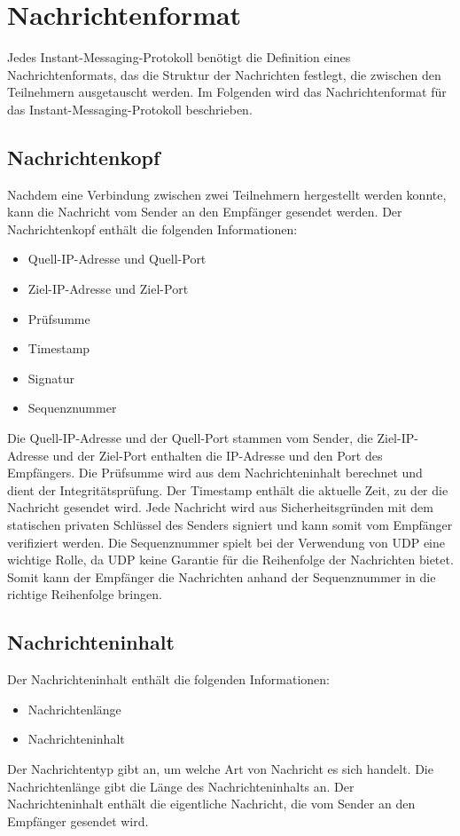 \section{Nachrichtenformat}
\label{sec:nachrichtenformat}

Jedes Instant-Messaging-Protokoll benötigt die Definition eines Nachrichtenformats, das die Struktur der Nachrichten festlegt, die zwischen den Teilnehmern ausgetauscht werden. Im Folgenden wird das Nachrichtenformat für das Instant-Messaging-Protokoll beschrieben.

\subsection{Nachrichtenkopf}

Nachdem eine Verbindung zwischen zwei Teilnehmern hergestellt werden konnte, kann die Nachricht vom Sender an den Empfänger gesendet werden. Der Nachrichtenkopf enthält die folgenden Informationen:

\begin{itemize}
    \item Quell-IP-Adresse und Quell-Port
    \item Ziel-IP-Adresse und Ziel-Port
    \item Prüfsumme
    \item Timestamp
    \item Signatur
    \item Sequenznummer
\end{itemize}

\noindent Die Quell-IP-Adresse und der Quell-Port stammen vom Sender, die Ziel-IP-Adresse und der Ziel-Port enthalten die IP-Adresse und den Port des Empfängers. Die Prüfsumme wird aus dem Nachrichteninhalt berechnet und dient der Integritätsprüfung. Der Timestamp enthält die aktuelle Zeit, zu der die Nachricht gesendet wird. Jede Nachricht wird aus Sicherheitsgründen mit dem statischen privaten Schlüssel des Senders signiert und kann somit vom Empfänger verifiziert werden. Die Sequenznummer spielt bei der Verwendung von UDP eine wichtige Rolle, da UDP keine Garantie für die Reihenfolge der Nachrichten bietet. Somit kann der Empfänger die Nachrichten anhand der Sequenznummer in die richtige Reihenfolge bringen.

\subsection{Nachrichteninhalt}

Der Nachrichteninhalt enthält die folgenden Informationen:

\begin{itemize}
    \item Nachrichtenlänge
    \item Nachrichteninhalt
\end{itemize}

\noindent Der Nachrichtentyp gibt an, um welche Art von Nachricht es sich handelt. Die Nachrichtenlänge gibt die Länge des Nachrichteninhalts an. Der Nachrichteninhalt enthält die eigentliche Nachricht, die vom Sender an den Empfänger gesendet wird.
